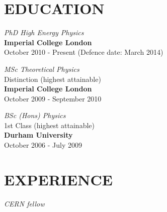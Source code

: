 \documentclass[margin, 10pt]{res} %
\begin{document}
\begin{resume}


\section{EDUCATION}

{\sl PhD High Energy Physics} \\
{\bf Imperial College London} \\
October 2010 - Present (Defence date: March 2014)

{\sl MSc Theoretical Physics} \\ %
Distinction (highest attainable) \\ %
{\bf Imperial College London} \\
October 2009 - September 2010

{\sl BSc (Hons) Physics} \\ %
1st Class (highest attainable) \\ %
{\bf Durham University} \\
October 2006 - July 2009


\section{EXPERIENCE}

{\sl CERN fellow}\\


\end{resume}
\end{document}
